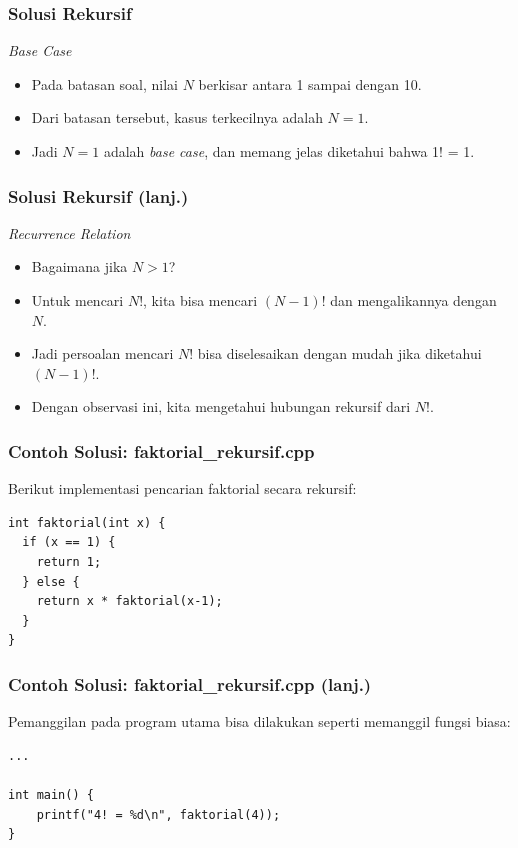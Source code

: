 \begin{frame}
\frametitle{Solusi Rekursif}
\textit{Base Case}
\begin{itemize}
  \item Pada batasan soal, nilai $N$ berkisar antara 1 sampai dengan 10.
  \item Dari batasan tersebut, kasus terkecilnya adalah $N=1$.
  \item Jadi $N=1$ adalah \textit{base case}, dan memang jelas diketahui bahwa 1! = 1.
\end{itemize}
\end{frame}

\begin{frame}
\frametitle{Solusi Rekursif (lanj.) }
\textit{Recurrence Relation}
\begin{itemize}
  \item Bagaimana jika $N > 1$?
  \item Untuk mencari $N!$, kita bisa mencari $(N-1)!$ dan mengalikannya dengan $N$.
  \item Jadi persoalan mencari $N!$ bisa diselesaikan dengan mudah jika diketahui $(N-1)!$.
  \item Dengan observasi ini, kita mengetahui hubungan rekursif dari $N!$. 
\end{itemize}
\end{frame}

\begin{frame}[fragile]
\frametitle{Contoh Solusi: faktorial\_rekursif.cpp}
Berikut implementasi pencarian faktorial secara rekursif:
\begin{lstlisting}
int faktorial(int x) {
  if (x == 1) {
    return 1;
  } else {
    return x * faktorial(x-1);
  }
}
\end{lstlisting}
\end{frame}

\begin{frame}[fragile]
\frametitle{Contoh Solusi: faktorial\_rekursif.cpp (lanj.)}
Pemanggilan pada program utama bisa dilakukan seperti memanggil fungsi biasa:
\begin{lstlisting}
...
  
int main() {
    printf("4! = %d\n", faktorial(4));
}
\end{lstlisting}
\end{frame}

